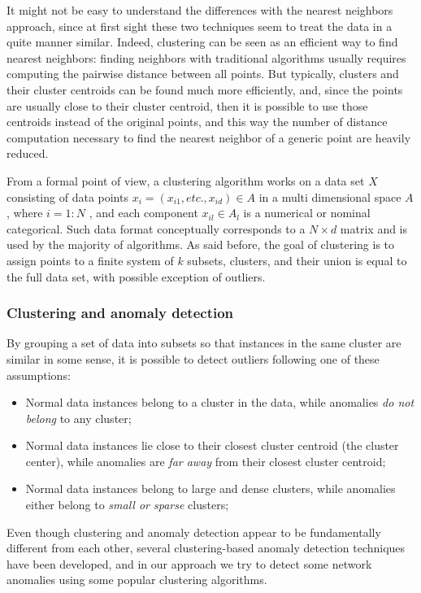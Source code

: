 \documentclass[12pt,a4paper,cucitura]{toptesi}
\begin{document}
It might not be easy to understand the differences with the nearest neighbors approach, since at first sight these two techniques seem to treat the data in a quite manner similar.
Indeed, clustering can be seen as an efficient way to find nearest neighbors: finding neighbors with traditional algorithms usually requires computing the pairwise distance between all points.
But typically, clusters and their cluster centroids can be found much more efficiently, and, since the points are usually close to their cluster centroid, then it is possible to use those centroids instead of the original points, and this way the number of distance computation necessary to find the nearest neighbor of a generic point are heavily reduced.

From a formal point of view, a clustering algorithm works on a data set $X$ consisting of data points $x_i = (x_{i1}, etc., x_{id}) \in A$ in a multi dimensional space $A$, where $i = 1:N$ , and each component $x_{il} \in A_{l}$ is a numerical or nominal categorical.
Such data format conceptually corresponds to a $N \times d$ matrix and is used by the majority of algorithms.
As said before, the goal of clustering is to assign points to a finite system of $k$ subsets, clusters, and their union is equal to the full data set, with possible exception of outliers.

\subsubsection{Clustering and anomaly detection}

By grouping a set of data into subsets so that instances in the same cluster are similar in some sense, it is possible to detect outliers following one of these assumptions:

\begin{itemize}
\item Normal data instances belong to a cluster in the data, while anomalies \emph{do not belong} to any cluster;
\item Normal data instances lie close to their closest cluster centroid (the cluster center), while anomalies are \emph{far away} from their closest cluster centroid;
\item Normal data instances belong to large and dense clusters, while anomalies either belong to \emph{small or sparse} clusters;
\end{itemize}

Even though clustering and anomaly detection appear to be fundamentally different from each other, several clustering-based anomaly detection techniques have been developed, and in our approach we try to detect some network anomalies using some popular clustering algorithms.
\end{document}
